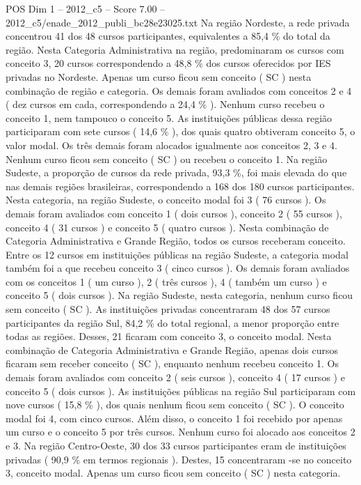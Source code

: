 \begin{textsample}{POS Dim 1 – 2012\_c5 – Score 7.00 – 2012\_c5/enade\_2012\_publi\_bc28e23025.txt}
Na região Nordeste, a rede privada concentrou 41 dos 48 cursos participantes, equivalentes a 85,4 \% do total da região.
Nesta Categoria Administrativa na região, predominaram os cursos com conceito 3, 20 cursos correspondendo a 48,8 \% dos cursos oferecidos por IES privadas no Nordeste.
Apenas um curso ficou sem conceito ( SC ) nesta combinação de região e categoria.
Os demais foram avaliados com conceitos 2 e 4 ( dez cursos em cada, correspondendo a 24,4 \% ).
Nenhum curso recebeu o conceito 1, nem tampouco o conceito 5.
As instituições públicas dessa região participaram com sete cursos ( 14,6 \% ), dos quais quatro obtiveram conceito 5, o valor modal.
Os três demais foram alocados igualmente aos conceitos 2, 3 e 4.
Nenhum curso ficou sem conceito ( SC ) ou recebeu o conceito 1.
Na região Sudeste, a proporção de cursos da rede privada, 93,3 \%, foi mais elevada do que nas demais regiões brasileiras, correspondendo a 168 dos 180 cursos participantes.
Nesta categoria, na região Sudeste, o conceito modal foi 3 ( 76 cursos ).
Os demais foram avaliados com conceito 1 ( dois cursos ), conceito 2 ( 55 cursos ), conceito 4 ( 31 cursos ) e conceito 5 ( quatro cursos ).
Nesta combinação de Categoria Administrativa e Grande Região, todos os cursos receberam conceito.
Entre os 12 cursos em instituições públicas na região Sudeste, a categoria modal também foi a que recebeu conceito 3 ( cinco cursos ).
Os demais foram avaliados com os conceitos 1 ( um curso ), 2 ( três cursos ), 4 ( também um curso ) e conceito 5 ( dois cursos ).
Na região Sudeste, nesta categoria, nenhum curso ficou sem conceito ( SC ).
As instituições privadas concentraram 48 dos 57 cursos participantes da região Sul, 84,2 \% do total regional, a menor proporção entre todas as regiões.
Desses, 21 ficaram com conceito 3, o conceito modal.
Nesta combinação de Categoria Administrativa e Grande Região, apenas dois cursos ficaram sem receber conceito ( SC ), enquanto nenhum recebeu conceito 1.
Os demais foram avaliados com conceito 2 ( seis cursos ), conceito 4 ( 17 cursos ) e conceito 5 ( dois cursos ).
As instituições públicas na região Sul participaram com nove cursos ( 15,8 \% ), dos quais nenhum ficou sem conceito ( SC ).
O conceito modal foi 4, com cinco cursos.
Além disso, o conceito 1 foi recebido por apenas um curso e o conceito 5 por três cursos.
Nenhum curso foi alocado aos conceitos 2 e 3.
Na região Centro-Oeste, 30 dos 33 cursos participantes eram de instituições privadas ( 90,9 \% em termos regionais ).
Destes, 15 concentraram -se no conceito 3, conceito modal.
Apenas um curso ficou sem conceito ( SC ) nesta categoria.

\end{textsample}
